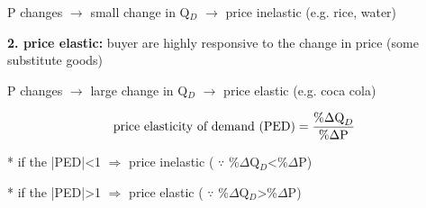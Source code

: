 \documentclass[UTF8]{article}
\begin{document}
P changes $\longrightarrow$ small change in Q$_D$ $\longrightarrow$ price inelastic (e.g. rice, water)

\textbf{2. price elastic:} buyer are highly responsive to the change in price (some substitute goods)

P changes $\longrightarrow$ large change in Q$_D$ $\longrightarrow$ price elastic (e.g. coca cola)

\begin{equation}
    \text{price elasticity of demand (PED)} = {{\% \Delta \text{Q}_D}\over \% \Delta \text{P}}
    \nonumber
\end{equation}

* if the |PED|<1 $\Longrightarrow$ price inelastic ( $\because$ \%$\Delta$Q$_D$<\%$\Delta$P)

* if the |PED|>1 $\Longrightarrow$ price elastic ( $\because$ \%$\Delta$Q$_D$>\%$\Delta$P)
\end{document}
